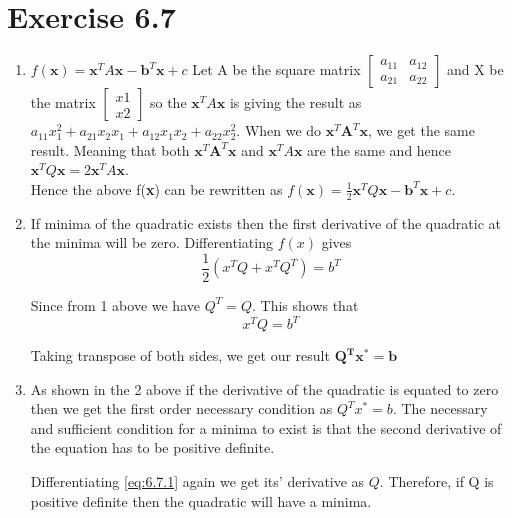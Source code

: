 \documentclass[letterpaper,12pt]{article}
\theoremstyle{definition}
\begin{document}
\section*{Exercise 6.7}
\begin{enumerate}
\item
$f(\textbf{x}) = \textbf{x}^TA\textbf{x} - \textbf{b}^T\textbf{x} + c$
Let A be the square matrix 
$\left[
\begin{matrix}
a_{11} &a_{12}\\
a_{21} &a_{22}
\end{matrix}
\right]$
and X be the matrix $\left[
\begin{matrix}
x1\\
x2
\end{matrix}
\right]$
so the $\textbf{x}^TA\textbf{x}$ is giving the result as $a_{11}x_{1}^2+a_{21}x_{2}x_{1}+a_{12}x_{1}x_{2}+a_{22}x_{2}^2.$
When we do  $\textbf{x}^T\textbf{A}^T\textbf{x}$, we get the same result. Meaning that both $\textbf{x}^T\textbf{A}^T\textbf{x}$ and $\textbf{x}^TA\textbf{x}$ are the same and hence $\textbf{x}^TQ\textbf{x} = 2\textbf{x}^TA\textbf{x}$.\\ Hence the above f(\textbf{x}) can be rewritten as 
$f(\textbf{x}) = \frac{1}{2}\textbf{x}^TQ\textbf{x} - \textbf{b}^T\textbf{x} + c.$

 \item If minima of the quadratic exists then the first derivative of the quadratic at the minima will be zero. Differentiating $f(x)$ gives
 \begin{equation*}\tag{6.7.1} \label{eq:6.7.1}
\frac{1}{2}(x^TQ + x^TQ^T) = b^T
\end{equation*}    
 
 Since from 1 above we have $Q^T = Q$. This shows that 
   \begin{equation*}
x^TQ  = b^T
\end{equation*}   

Taking transpose of both sides, we get our result 
$\mathbf {Q^Tx^* = b}$
\item As shown in the 2 above if the derivative of the quadratic is equated to zero then we get the first order necessary condition as  $ Q^Tx^* = b$. The necessary and sufficient condition for a minima to exist is that the second derivative of the equation has to be positive definite.

Differentiating \eqref{eq:6.7.1} again we get its' derivative as $Q$. Therefore, if Q is positive definite then the quadratic will have a minima.

\end{enumerate}
\end{document}
